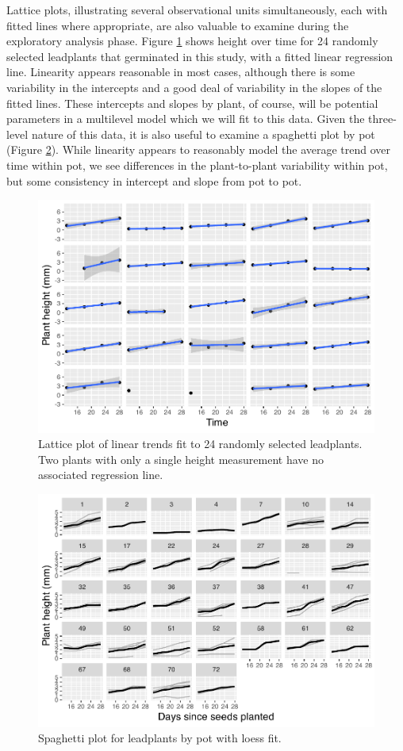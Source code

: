 \documentclass[
]{krantz}
\begin{document}
Lattice plots, illustrating several observational units simultaneously, each with fitted lines where appropriate, are also valuable to examine during the exploratory analysis phase. Figure \ref{fig:lattlpall} shows height over time for 24 randomly selected leadplants that germinated in this study, with a fitted linear regression line. Linearity appears reasonable in most cases, although there is some variability in the intercepts and a good deal of variability in the slopes of the fitted lines. These intercepts and slopes by plant, of course, will be potential parameters in a multilevel model which we will fit to this data. Given the three-level nature of this data, it is also useful to examine a spaghetti plot by pot (Figure \ref{fig:spaglppot}). While linearity appears to reasonably model the average trend over time within pot, we see differences in the plant-to-plant variability within pot, but some consistency in intercept and slope from pot to pot.

\begin{figure}

{\centering \includegraphics[width=0.6\linewidth]{bookdown-BeyondMLR_files/figure-latex/lattlpall-1} 

}

\caption{ Lattice plot of linear trends fit to 24 randomly selected leadplants.  Two plants with only a single height measurement have no associated regression line.}\label{fig:lattlpall}
\end{figure}

\begin{figure}

{\centering \includegraphics[width=0.6\linewidth]{bookdown-BeyondMLR_files/figure-latex/spaglppot-1} 

}

\caption{Spaghetti plot for leadplants by pot with loess fit.}\label{fig:spaglppot}
\end{figure}
\end{document}
